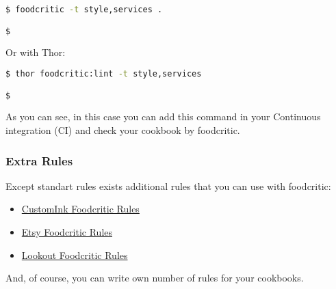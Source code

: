 \begin{lstlisting}[language=Bash,label=lst:testing-thor8]
$ foodcritic -t style,services .

$
\end{lstlisting}

Or with Thor:

\begin{lstlisting}[language=Bash,label=lst:testing-thor9]
$ thor foodcritic:lint -t style,services

$
\end{lstlisting}

As you can see, in this case you can add this command in your Continuous integration (CI) and check your cookbook by foodcritic.

\subsubsection{Extra Rules}

Except standart rules exists additional rules that you can use with foodcritic:

\begin{itemize}
  \item \href{https://github.com/customink-webops/foodcritic-rules}{CustomInk Foodcritic Rules}
  \item \href{https://github.com/etsy/foodcritic-rules}{Etsy Foodcritic Rules}
  \item \href{https://github.com/lookout/lookout-foodcritic-rules}{Lookout Foodcritic Rules}
\end{itemize}

And, of course, you can write own number of rules for your cookbooks.
